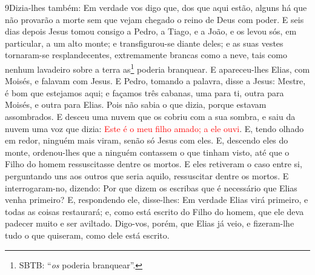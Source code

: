 \medskip

\lettrine{9} Dizia-lhes também: Em verdade vos digo que, dos
que aqui estão, alguns há que não provarão a morte sem que vejam
chegado o reino de Deus com poder. E seis dias depois Jesus
tomou consigo a Pedro, a Tiago, e a João, e os levou sós, em
particular, a um alto monte; e transfigurou-se diante deles; e
as suas vestes tornaram-se resplandecentes, extremamente brancas
como a neve, tais como nenhum lavadeiro sobre a terra
as\footnote{SBTB: ``\emph{os} poderia branquear''.} poderia
branquear. E apareceu-lhes Elias, com Moisés, e falavam com
Jesus. E Pedro, tomando a palavra, disse a Jesus: Mestre, é bom
que estejamos aqui; e façamos três cabanas, uma para ti, outra para
Moisés, e outra para Elias. Pois não sabia o que dizia, porque
estavam assombrados. E desceu uma nuvem que os cobriu com a sua
sombra, e saiu da nuvem uma voz que dizia: \textcolor{red}{Este é o meu
filho amado; a ele ouvi}. E, tendo olhado em redor, ninguém mais
viram, senão só Jesus com eles. E, descendo eles do monte,
ordenou-lhes que a ninguém contassem o que tinham visto, até que o
Filho do homem ressuscitasse dentre os mortos. E eles
retiveram o caso entre si, perguntando uns aos outros que seria
aquilo, ressuscitar dentre os mortos. E interrogaram-no,
dizendo: Por que dizem os escribas que é necessário que Elias venha
primeiro? E, respondendo ele, disse-lhes: Em verdade Elias
virá primeiro, e todas as coisas restaurará; e, como está escrito do
Filho do homem, que ele deva padecer muito e ser aviltado.
Digo-vos, porém, que Elias já veio, e fizeram-lhe tudo o que
quiseram, como dele está escrito.

